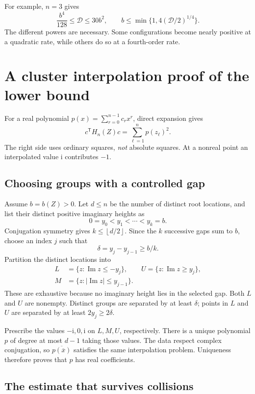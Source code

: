 \documentclass[11pt]{article}
\theoremstyle{definition}
\newcommand{\I}{\mathrm i}
\newcommand{\Impart}{\operatorname{Im}}
\newcommand{\defect}{\mathcal D}
\newcommand{\floor}[1]{\left\lfloor#1\right\rfloor}
\begin{document}
For example, $n=3$ gives
\[
 \frac{b^4}{128}\leq\defect\leq30b^2,
 \qquad b\leq\min\{1,4(\defect/2)^{1/4}\}.
\]
The different powers are necessary. Some configurations become nearly
positive at a quadratic rate, while others do so at a fourth-order rate.

\section{A cluster interpolation proof of the lower bound}

For a real polynomial $p(x)=\sum_{r=0}^{n-1}c_rx^r$, direct expansion gives
\begin{equation}
 c^{\mathsf T}H_n(Z)c=\sum_{\ell=1}^n p(z_\ell)^2.
 \label{eq:quadratic}
\end{equation}
The right side uses ordinary squares, \emph{not} absolute squares. At a
nonreal point an interpolated value $\I$ contributes $-1$.

\subsection{Choosing groups with a controlled gap}

Assume $b=b(Z)>0$. Let $d\leq n$ be the number of distinct root locations,
and list their distinct positive imaginary heights as
\[
 0=y_0<y_1<\cdots<y_k=b.
\]
Conjugation symmetry gives $k\leq\floor{d/2}$. Since the $k$ successive gaps
sum to $b$, choose an index $j$ such that
\begin{equation}
 \delta=y_j-y_{j-1}\geq b/k.
 \label{eq:gap}
\end{equation}
Partition the distinct locations into
\[
 \begin{split}
 L&=\{z:\Impart z\leq-y_j\},\qquad
 U=\{z:\Impart z\geq y_j\},\\
 M&=\{z:|\Impart z|\leq y_{j-1}\}.
 \end{split}
\]
These are exhaustive because no imaginary height lies in the selected gap.
Both $L$ and $U$ are nonempty. Distinct groups are separated by at least
$\delta$; points in $L$ and $U$ are separated by at least $2y_j\geq2\delta$.

Prescribe the values $-\I,0,\I$ on $L,M,U$, respectively. There is a unique
polynomial $p$ of degree at most $d-1$ taking those values. The data respect
complex conjugation, so $\overline{p(\overline{x})}$ satisfies the same
interpolation problem. Uniqueness therefore proves that $p$ has real
coefficients.

\subsection{The estimate that survives collisions}
\end{document}
